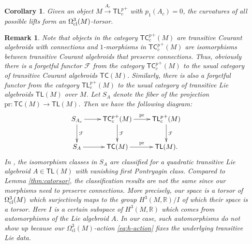 \documentclass[letterpaper,10pt, oneside]{article} %
\newtheorem{cor}[thm]{Corollary}
\newtheorem{rmk}[thm]{Remark}
\newcommand{\tlp}{{\mathsf{TL}^{p}_{c}}} %
\newcommand{\tl}{\mathsf{TL}}
\newcommand{\tcalgdp}{{\mathsf{TC}^{p}_{c}}} %
\newcommand{\tc}{\mathsf{TC}}%
\newcommand{\cl}{\mathrm{cl}}
\newcommand{\cs}{\mathrm{cs}}
\newcommand{\R}{\mathbb R}\newcommand{\Z}{\mathbb Z}
\newcommand{\huaF}{\mathcal{F}}
\newcommand{\pr}{\mathrm{pr}}
\begin{document}

\begin{cor}\label{cor:curv-courant}
  Given an object $M\stackrel{A_c}{\longrightarrow}\tlp^+$ with $p_1(A_c)=0$, the curvatures of all possible lifts form an $\Omega^3_{\rm cl}(M)$-torsor.
\end{cor}

\begin{rmk}
 Note that objects in the category  ${\tcalgdp}^+(M)$ are transitive Courant algebroids with connections and $1$-morphisms in  ${\tcalgdp}^+(M)$ are isomorphisms between transitive Courant algebroids that preserve connections.
 Thus, obviously there is a forgetful functor $\huaF$ from the category  ${\tcalgdp}^+(M)$ to the usual category of transitive Courant algebroids $\tc(M)$. Similarly, there is also a forgetful functor from the category $\tlp^+(M)$ to the usual category of transitive Lie algebroids $\tl(M)$ over $M$.  %
Let $S_A$ denote the fiber of the projection $\pr:\tc(M)\longrightarrow \tl(M)$. Then we have the following diagram:
  \[
 \xymatrix{S_{A_c}\ar[r]\ar[d]^{\huaF}& {\tcalgdp}^+(M)   \ar[r]^{\pr}\ar[d]^{\huaF}&\tlp^+(M)\ar[d]^{\huaF}\\
S_A\ar[r] &\tc(M)\ar[r]^{ \pr}&\tl(M).
 }
 \]
 In \cite{ChenRCA}, the isomorphism classes in $S_{A}$ are classified
 for a quadratic transitive Lie algebroid $A\in\tl(M)$ with vanishing
 first Pontryagin class. Compared to Lemma \ref{thm:catorsor}, the
 classification results are not the same since our morphisms need to
 preserve connections. More precisely, our space is a torsor of
 $\Omega_{\rm cl}^3(M)$ which surjectively maps to the group $H^3(M,
 \R)/I$ of which their space is a torsor. Here $I$ is a certain
 subspace of $H^3(M, \R)$ which comes from automorphisms of the Lie
 algebroid $A$. In our case, such automorphisms do not show up because
 our $\Omega^3_{\cl}(M)$-action \eqref{eq:h-action} fixes the underlying
 transitive Lie data.
\end{rmk}
\end{document}
